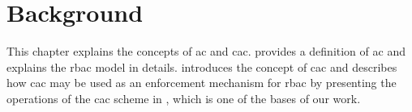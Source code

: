 \chapter{Background}
\label{sec:background}

This chapter explains the concepts of \gls{ac} and \gls{cac}.  provides a definition of \gls{ac} and explains the \gls{rbac} model in details.  introduces the concept of \gls{cac} and describes how \gls{cac} may be used as an enforcement mechanism for \gls{rbac} by presenting the operations of the \gls{cac} scheme in \cite{cac}, which is one of the bases of our work.







